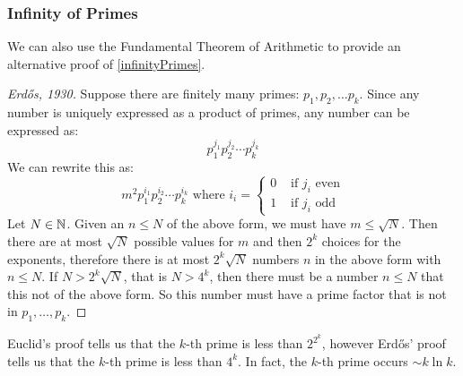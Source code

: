 \documentclass[../main.tex]{subfiles}
\begin{document}
\subsubsection{Infinity of Primes}
We can also use the Fundamental Theorem of Arithmetic to provide an alternative proof of \cref{infinityPrimes}.
\begin{proof}[Erd\H{o}s, 1930]
  Suppose there are finitely many primes: $p_1, p_2, \ldots p_k$.
  Since any number is uniquely expressed as a product of primes, any number can be expressed as:
  \[
    p^{j_1}_{1} p^{j_2}_{2} \cdots p^{j_k}_{k}
  \]
  We can rewrite this as:
  \[
    m^2 p^{i_1}_{1} p^{i_2}_{2} \cdots p^{i_k}_{k} \text{ where } i_i = \begin{cases}
    0 & \text{ if $j_i$ even} \\
    1 & \text{ if $j_i$ odd}
    \end{cases}
  \]
  Let $N \in \mathbb{N}$.
  Given an $n \leq N$ of the above form, we must have $m \leq \sqrt{N}$.
  Then there are at most $\sqrt{N}$ possible values for $m$ and then $2^{k}$ choices for the exponents, therefore there is at most $2^{k}\sqrt{N}$ numbers $n$ in the above form with $n \leq N$.
  If $N > 2^{k}\sqrt{N}$, that is $N > 4^{k}$, then there must be a number $n \leq N$ that this not of the above form.
  So this number must have a prime factor that is not in $p_1, \ldots, p_k$.
\end{proof}
\begin{remark}
  Euclid's proof tells us that the $k$-th prime is less than $2^{2^{k}}$, however Erd\H{o}s' proof tells us that the $k$-th prime is less than $4^{k}$.
  In fact, the $k$-th prime occurs $\sim k \ln k$.
\end{remark}
\end{document}
